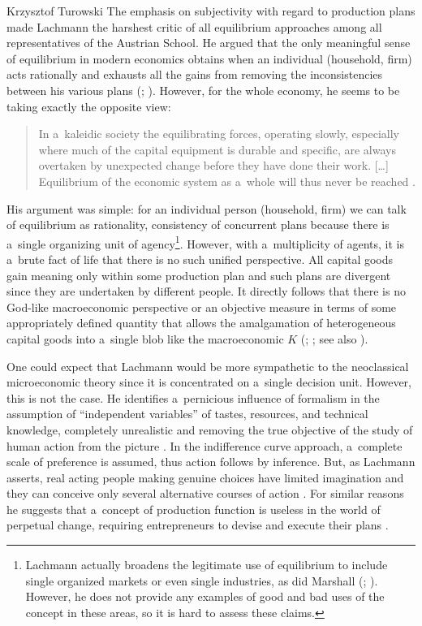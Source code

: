 \begin{artengenv}{Krzysztof Turowski}
The emphasis on subjectivity with regard to production plans made Lachmann the harshest critic of all equilibrium approaches among all representatives of the Austrian School.
He argued that the only meaningful sense of equilibrium in modern economics obtains when an individual (household, firm) acts rationally and exhausts all the gains from removing the inconsistencies between his various plans (\cite[15]{lachmann1973macro}; \citeyear[141]{lachmann1986market}). However, for the whole economy, he seems to be taking exactly the opposite view:
\begin{quote}
In a~kaleidic society the equilibrating forces, operating slowly, especially where much of the capital equipment is durable and specific, are always overtaken by unexpected change before they have done their work. [\ldots] Equilibrium of the economic system as a~whole will thus never be reached \parencite[60--61]{lachmann-kaleidic}.
\end{quote}
His argument was simple: for an individual person (household, firm) we can talk of equilibrium as rationality, consistency of concurrent plans because there is a~single organizing unit of agency\footnote{Lachmann actually broadens the legitimate use of equilibrium to include single organized markets or even single industries, as did Marshall (\cite[37]{lachmann-crisis}; \citeyear[149--150]{lachmann-individualism}). However, he does not provide any examples of good and bad uses of the concept in these areas, so it is hard to assess these claims.}.
However, with a~multiplicity of agents, it is a~brute fact of life that there is no such unified perspective.
All capital goods gain meaning only within some production plan and such plans are divergent since they are undertaken by different people. It directly follows that there is no God-like macroeconomic perspective or an objective measure in terms of some appropriately defined quantity that allows the amalgamation of heterogeneous capital goods into a~single blob like the macroeconomic $K$ (\cite[175--177]{lachmann-salvage}; \citeyear[194]{lachmann-hayek}; see also \cite{garzarelli}).

One could expect that Lachmann would be more sympathetic to the neoclassical microeconomic theory since it is concentrated on a~single decision unit. However, this is not the case. He identifies a~pernicious influence of formalism in the assumption of ``independent variables'' of tastes, resources, and technical knowledge, completely unrealistic and removing the true objective of the study of human action from the picture \parencite[217--220]{lachmann-vicissitudes}.
In the indifference curve approach, a~complete scale of preference is assumed, thus action follows by inference. But, as Lachmann asserts, real acting people making genuine choices have limited imagination and they can conceive only several alternative courses of action \parencite[216]{lachmann-vicissitudes}. For similar reasons he suggests that a~concept of production function is useless in the world of perpetual change, requiring entrepreneurs to devise and execute their plans \parencite[312]{lachmann-market-distribution}.


\end{artengenv}
